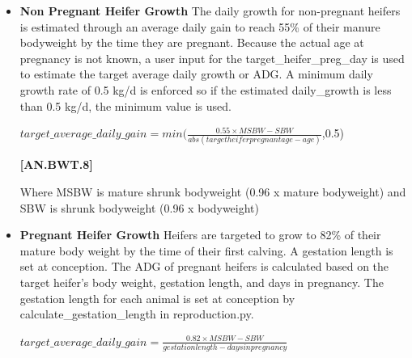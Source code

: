 \documentclass{article}
\begin{document}
\begin{refsection}
\begin{itemize}
\begin{center}
    \(target\_average\_daily\_gain = \frac{birth\ weight}{wean\ day}\)
    
\end{center}
    \vspace{0.5cm}
    
    {\raggedleft \textbf{[AN.BWT.7]}\par}
    \vspace{0.5cm}
    
    \item \textbf{Non Pregnant Heifer Growth} The daily growth for non-pregnant heifers is estimated through an average daily gain to reach 55\% of their manure bodyweight by the time they are pregnant. Because the actual age at pregnancy is not known, a user input for the target\_heifer\_preg\_day is used to estimate the target average daily growth or ADG. A minimum daily growth rate of 0.5 kg/d is enforced so if the estimated daily\_growth is less than 0.5 kg/d, the minimum value is used. 
    \vspace{0.5cm}
    
 \begin{center}
    \(target\_average\_daily\_gain = min(\frac{0.55×MSBW-SBW}{abs(target heifer pregnant age-age)}\),0.5)
\end{center}
    \vspace{0.5cm}
    
    {\raggedleft \textbf{[AN.BWT.8]}\par}
    \vspace{0.5cm}
    
    Where MSBW is mature shrunk bodyweight (0.96 x mature bodyweight) and SBW is shrunk bodyweight (0.96 x bodyweight)
    
    \item \textbf{Pregnant Heifer Growth} Heifers are targeted to grow to 82\% of their mature body weight by the time of their first calving. A gestation length is set at conception. The ADG of pregnant heifers is calculated based on the target heifer's body weight, gestation length, and days in pregnancy. The gestation length for each animal is set at conception by calculate\_gestation\_length in reproduction.py.
    \vspace{0.5cm}
 
\begin{center}
    \(target\_average\_daily\_gain = \frac{0.82×MSBW-SBW}{gestation length - days in pregnancy}\)
\end{center}
    \vspace{0.5cm}
    

\end{itemize}
\end{refsection}
\end{document}
